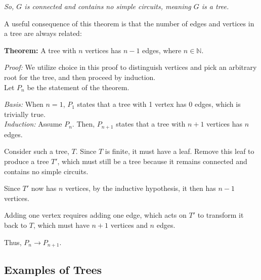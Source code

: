 \documentclass[a4paper,10pt]{report}
\begin{document}
\textit{So, $G$ is connected and contains no simple circuits, meaning $G$ is a tree.}

\hrulefill

A useful consequence of this theorem is that the number of edges and vertices in a tree are always related:

\textbf{Theorem:} A tree with $n$ vertices has $n-1$ edges, where $n\in\mathbb{N}$.

\textit{Proof: }We utilize choice in this proof to distinguish vertices and pick an arbitrary root for the tree, and then proceed by induction. \\

Let $P_n$ be the statement of the theorem.

\textit{Basis: }
When $n=1$, $P_1$ states that a tree with 1 vertex has 0 edges, which is trivially true. \\

\textit{Induction: }
Assume $P_n$. Then, $P_{n+1}$ states that a tree with $n+1$ vertices has $n$ edges.

Consider such a tree, $T$. Since $T$ is finite, it must have a leaf. Remove this leaf to produce a tree $T'$, which must still be a tree because it remains connected and contains no simple circuits.

Since $T'$ now has $n$ vertices, by the inductive hypothesis, it then has $n-1$ vertices.

Adding one vertex requires adding one edge, which acts on $T'$ to transform it back to $T$, which must have $n+1$ vertices and $n$ edges.

\centering
Thus, $P_n \rightarrow P_{n+1}$. $\qquad$

\hrulefill

\subsection{Examples of Trees}
\end{document}
